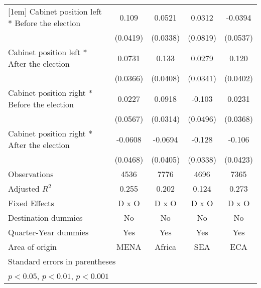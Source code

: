 \begin{table}[htbp]
\begin{tabular}{l*{4}{c}}
[1em]
Cabinet position left * Before the election&       0.109\sym{*}  &      0.0521         &      0.0312         &     -0.0394         \\
                    &    (0.0419)         &    (0.0338)         &    (0.0819)         &    (0.0537)         \\
[1em]
Cabinet position left * After the election&      0.0731         &       0.133\sym{**} &      0.0279         &       0.120\sym{**} \\
                    &    (0.0366)         &    (0.0408)         &    (0.0341)         &    (0.0402)         \\
[1em]
Cabinet position right * Before the election&      0.0227         &      0.0918\sym{**} &      -0.103         &      0.0231         \\
                    &    (0.0567)         &    (0.0314)         &    (0.0496)         &    (0.0368)         \\
[1em]
Cabinet position right * After the election&     -0.0608         &     -0.0694         &      -0.128\sym{**} &      -0.106\sym{*}  \\
                    &    (0.0468)         &    (0.0405)         &    (0.0338)         &    (0.0423)         \\
\hline
Observations        &        4536         &        7776         &        4696         &        7365         \\
Adjusted \(R^{2}\)  &       0.255         &       0.202         &       0.124         &       0.273         \\
Fixed Effects       &       D x O         &       D x O         &       D x O         &       D x O         \\
Destination dummies &          No         &          No         &          No         &          No         \\
Quarter-Year dummies&         Yes         &         Yes         &         Yes         &         Yes         \\
Area of origin      &        MENA         &      Africa         &         SEA         &         ECA         \\
\hline\hline
\multicolumn{5}{l}{\footnotesize Standard errors in parentheses}\\
\multicolumn{5}{l}{\footnotesize \sym{*} \(p<0.05\), \sym{**} \(p<0.01\), \sym{***} \(p<0.001\)}\\
\end{tabular}
\end{table}
